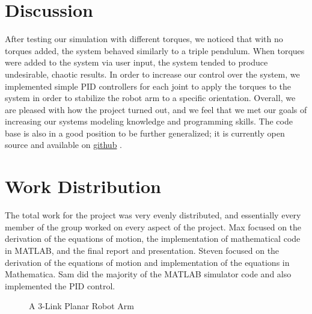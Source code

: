 \documentclass[a4paper]{article}
\begin{document}
\section*{Discussion}

After testing our simulation with different torques, we noticed that with no torques added, the system behaved similarly to a triple pendulum. When torques were added to the system via user input, the system tended to produce undesirable, chaotic results. In order to increase our control over the system, we implemented simple PID controllers for each joint to apply the torques to the system in order to stabilize the robot arm to a specific orientation. Overall, we are pleased with how the project turned out, and we feel that we met our goals of increasing our systems modeling knowledge and programming skills.  The code base is also in a good position to be further generalized; it is currently open source and available on \href{http://www.sharelatex.com}{github} .\\

\section*{Work Distribution}

The total work for the project was very evenly distributed, and essentially every member of the group worked on every aspect of the project.  Max focused on the derivation of the equations of motion, the implementation of mathematical code in MATLAB, and the final report and presentation.  Steven focused on the derivation of the equations of motion and implementation of the equations in Mathematica.  Sam did the majority of the MATLAB simulator code and also implemented the PID control. 

\begin{figure}[ht]
\caption{A 3-Link Planar Robot Arm}
\begin{center}
\end{center}
\end{figure}
\end{document}
